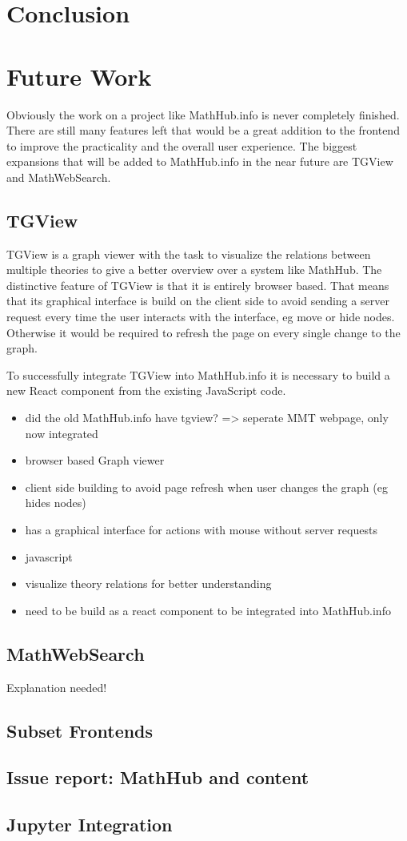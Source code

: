 \documentclass[11pt,a4paper]{article}
\begin{document}
\section{Conclusion}
\section{Future Work}
Obviously the work on a project like MathHub.info is never completely finished.
There are still many features left that would be a great addition to the frontend to improve the practicality and the overall user experience. 
The biggest expansions that will be added to MathHub.info in the near future are TGView and MathWebSearch.

	\subsection{TGView} 
	TGView is a graph viewer with the task to visualize the relations between multiple theories to give a better overview over a system like MathHub.
	 The distinctive feature of TGView is that it is entirely browser based. 
	 That means that its graphical interface is build on the client side to avoid sending a server request every time the user interacts with the interface, eg move or hide nodes.
	 Otherwise it would be required to refresh the page on every single change to the graph. 	\cite{tgview}
	 
	 To successfully integrate TGView into MathHub.info it is necessary to build a new React component from the existing JavaScript code.
	 
	\begin{itemize}
	\item did the old MathHub.info have tgview? => seperate MMT webpage, only now integrated
	\item browser based Graph viewer
	\item client side building to avoid page refresh when user changes the graph (eg hides nodes)
	\item has a graphical interface for actions with mouse without server requests
	\item javascript
	\item visualize theory relations for better understanding
	\item need to be build as a react component to be integrated into MathHub.info
	\end{itemize}
	\subsection{MathWebSearch}
	Explanation needed!
	\subsection{Subset Frontends}
	\subsection{Issue report: MathHub and content}
	\subsection{Jupyter Integration}

\printbibliography
{}
\end{document}
